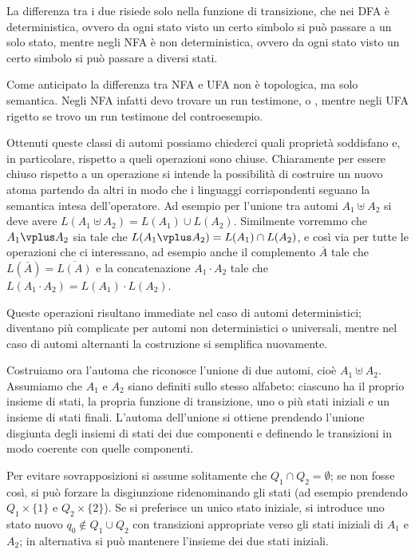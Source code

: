 La differenza tra i due risiede solo nella funzione di transizione, che nei DFA è deterministica, ovvero da ogni stato visto un certo simbolo si può passare a un solo stato, mentre negli NFA è non deterministica, ovvero da ogni stato visto un certo simbolo si può passare a diversi stati.

Come anticipato la differenza tra NFA e UFA non è topologica, ma solo semantica. Negli NFA infatti devo trovare un run testimone, o , mentre negli UFA rigetto se trovo un run testimone del controesempio.

Ottenuti queste classi di automi possiamo chiederci quali proprietà soddisfano e, in particolare, rispetto a queli operazioni sono chiuse. Chiaramente per essere chiuso rispetto a un operazione si intende la possibilità di costruire un nuovo atoma partendo da altri in modo che i linguaggi corrispondenti seguano la semantica intesa dell'operatore. Ad esempio per l'unione tra automi \(A_1 \uplus A_2\) si deve avere \(L(A_1 \uplus A_2) = L(A_1) \cup L(A_2)\). Similmente vorremmo che \(A_1 \vplus A_2\) sia tale che \(L(A_1 \vplus A_2) = L(A_1) \cap L(A_2)\), e così via per tutte le operazioni che ci interessano, ad esempio anche il complemento \(\overline{A}\) tale che \(L(\overline{A}) = \overline{L(A)}\) e la concatenazione \(A_1 \cdot A_2\) tale che \(L(A_1 \cdot A_2) = L(A_1) \cdot L(A_2)\).

Queste operazioni risultano immediate nel caso di automi deterministici; diventano più complicate per automi non deterministici o universali, mentre nel caso di automi alternanti la costruzione si semplifica nuovamente.

Costruiamo ora l'automa che riconosce l'unione di due automi, cioè \(A_1 \uplus A_2\). Assumiamo che \(A_1\) e \(A_2\) siano definiti sullo stesso alfabeto: ciascuno ha il proprio insieme di stati, la propria funzione di transizione, uno o più stati iniziali e un insieme di stati finali. L'automa dell'unione si ottiene prendendo l'unione disgiunta degli insiemi di stati dei due componenti e definendo le transizioni in modo coerente con quelle componenti.

Per evitare sovrapposizioni si assume solitamente che \(Q_1\cap Q_2=\emptyset\); se non fosse così, si può forzare la disgiunzione ridenominando gli stati (ad esempio prendendo \(Q_1\times\{1\}\) e \(Q_2\times\{2\}\)). Se si preferisce un unico stato iniziale, si introduce uno stato nuovo \(q_0\notin Q_1\cup Q_2\) con transizioni appropriate verso gli stati iniziali di \(A_1\) e \(A_2\); in alternativa si può mantenere l'insieme dei due stati iniziali.

